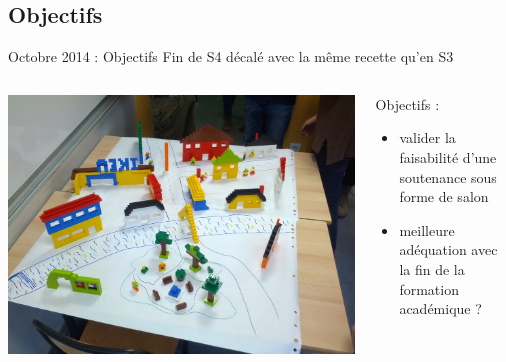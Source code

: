 \documentclass{beamer}
\begin{document}
\subsection{Objectifs}
\begin{frame}{Octobre 2014 : Objectifs}
  Fin de S4 décalé avec la même recette qu'en S3 
  \begin{columns}
    \begin{column}{0.5\textwidth}
      \begin{center}
        \includegraphics[width=\textwidth]{includes/201410_lego.jpg}      
      \end{center}
    \end{column}
    \begin{column}{0.5\textwidth}
      Objectifs : 
      \begin{itemize}
        \item valider la faisabilité d'une soutenance sous forme de salon 
        \item meilleure adéquation avec la fin de la formation académique ?
      \end{itemize}
    \end{column}
  \end{columns}
\end{frame}
\end{document}
